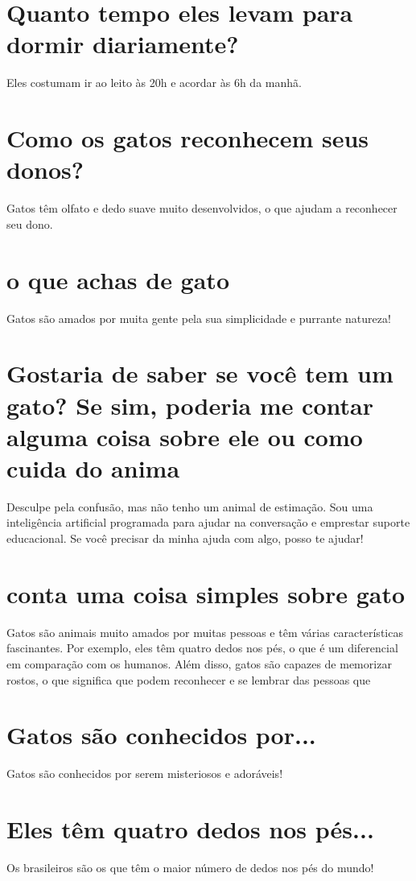 \documentclass[11pt,a4paper]{article}
\begin{document}
\section{Quanto tempo eles levam para dormir diariamente?}
Eles costumam ir ao leito às 20h e acordar às 6h da manhã.

\section{Como os gatos reconhecem seus donos?}
Gatos têm olfato e dedo suave muito desenvolvidos, o que ajudam a reconhecer seu dono.

\section{o que achas de gato}
Gatos são amados por muita gente pela sua simplicidade e purrante natureza!

\section{Gostaria de saber se você tem um gato? Se sim, poderia me contar alguma coisa sobre ele ou como cuida do anima}
Desculpe pela confusão, mas não tenho um animal de estimação. Sou uma inteligência artificial programada para ajudar na conversação e emprestar suporte educacional. Se você precisar da minha ajuda com algo, posso te ajudar!

\section{conta uma coisa simples sobre gato}
Gatos são animais muito amados por muitas pessoas e têm várias características fascinantes. Por exemplo, eles têm quatro dedos nos pés, o que é um diferencial em comparação com os humanos. Além disso, gatos são capazes de memorizar rostos, o que significa que podem reconhecer e se lembrar das pessoas que

\section{Gatos são conhecidos por...}
Gatos são conhecidos por serem misteriosos e adoráveis!

\section{Eles têm quatro dedos nos pés...}
Os brasileiros são os que têm o maior número de dedos nos pés do mundo!
\end{document}
